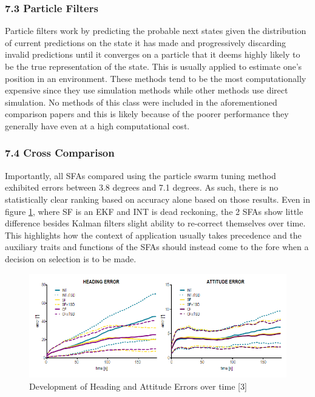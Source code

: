 \documentclass[10pt]{report}
\begin{document}
\newpage

\subsubsection{7.3 Particle Filters}
Particle filters work by predicting the probable next states given the distribution of current predictions on the state it has made and progressively discarding invalid predictions until it converges on a particle that it deems highly likely to be the true representation of the state. This is usually applied to estimate one’s position in an environment. These methods tend to be the most computationally expensive since they use simulation methods while other methods use direct simulation. No methods of this class were included in the aforementioned comparison papers and this is likely because of the poorer performance they generally have even at a high computational cost. 

\newpage
\subsubsection*{7.4 Cross Comparison}
Importantly, all SFAs compared using the particle swarm tuning method exhibited errors between 3.8 degrees and 7.1 degrees. As such, there is no statistically clear ranking based on accuracy alone based on those results. Even in figure \ref{fig:time}, where SF is an EKF and INT is dead reckoning, the 2 SFAs show little difference besides Kalman filters slight ability to re-correct themselves over time. This highlights how the context of application usually takes precedence and the auxiliary traits and functions of the SFAs should instead come to the fore when a decision on selection is to be made.

\begin{figure}[!h]
  \caption{Development of Heading and Attitude Errors over time [3]}
  \centering
  \label{fig:time}
  \includegraphics[width=1\textwidth]{compvstime.PNG}
\end{figure}
\end{document}
